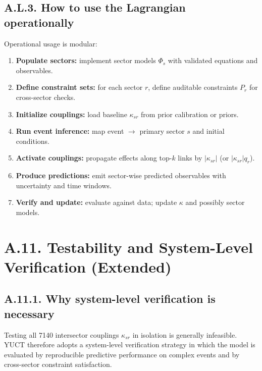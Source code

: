 \documentclass[13pt,a4paper]{article}
\begin{document}
	\subsection*{A.L.3. How to use the Lagrangian operationally}
	Operational usage is modular:
	\begin{enumerate}[leftmargin=*]
		\item \textbf{Populate sectors:} implement sector models $\Phi_s$ with validated equations and observables.
		\item \textbf{Define constraint sets:} for each sector $r$, define auditable constraints $P_r$ for cross-sector checks.
		\item \textbf{Initialize couplings:} load baseline $\kappa_{sr}$ from prior calibration or priors.
		\item \textbf{Run event inference:} map event $\to$ primary sector $s$ and initial conditions.
		\item \textbf{Activate couplings:} propagate effects along top-$k$ links by $|\kappa_{sr}|$ (or $|\kappa_{sr}|q_r$).
		\item \textbf{Produce predictions:} emit sector-wise predicted observables with uncertainty and time windows.
		\item \textbf{Verify and update:} evaluate against data; update $\kappa$ and possibly sector models.
	\end{enumerate}
	
	\section*{A.11. Testability and System-Level Verification (Extended)}
	\label{sec:extended-testability}
	
	\subsection*{A.11.1. Why system-level verification is necessary}
	Testing all 7140 intersector couplings $\kappa_{sr}$ in isolation is generally infeasible. YUCT therefore adopts a system-level verification strategy in which the model is evaluated by reproducible predictive performance on complex events and by cross-sector constraint satisfaction.
	
\end{document}
